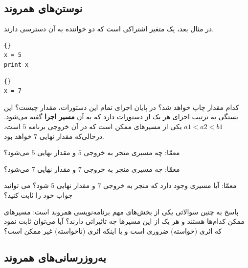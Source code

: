 \documentclass{book}
\begin{document}
\subsection {نوستن‌های همروند}
در مثال بعد،  یک متغیر اشتراکی است که دو خواننده به آن دسترسی دارند. 

\begin{latin}
\begin{minipage}[t]{2in}
\begin{latin}
\begin{lstlisting}[title=\rl{نخ \lr{A}}]{}
x = 5
print x
\end{lstlisting}
\end{latin}
\end{minipage}
\hfill
\begin{minipage}[t]{2in}
\begin{latin}
\begin{lstlisting}[title=\rl{نخ \lr{B}}]{}
x = 7
\end{lstlisting}
\end{latin}
\end{minipage}
\end{latin}

کدام مقدار  چاپ خواهد شد؟ در پایان اجرای تمام این دستورات، مقدار  چیست؟ 
این بستگی به ترتیب اجرای هر یک از دستورات دارد که به آن \textbf{مسیر اجرا} گفته می‌شود. 
$a1 < a2 < b1$ یکی از مسیرهای ممکن است که در آن خروجی برنامه 
\texttt{$5$} است، درحالی‌که مقدار نهایی \texttt{$7$} خواهد بود. 


معمّا: چه مسیری منجر به خروجی \texttt{$5$} و مقدار نهایی \texttt{$5$} می‌شود؟

معمّا: چه مسیری منجر به خروجی \texttt{$7$} و مقدار نهایی \texttt{$7$} می‌شود؟

معمّا: آیا مسیری وجود دارد که منجر به خروجی \texttt{$7$} و مقدار نهایی \texttt{$5$} شود؟ می توانید جواب خود را ثابت کنید؟

پاسخ به چنین سوالاتی یکی از بخش‌های مهم برنامه‌نویسی همروند است: مسیرهای ممکن کدام‌ها هستند و هر یک از این مسیرها چه تاثیراتی دارند؟ 
    آیا می‌توان ثابت نمود که اثری (خواسته) ضروری است و یا اینکه اثری (ناخواسته) غیر ممکن است؟


\subsection {به‌روزرسانی‌های همروند}
\end{document}
